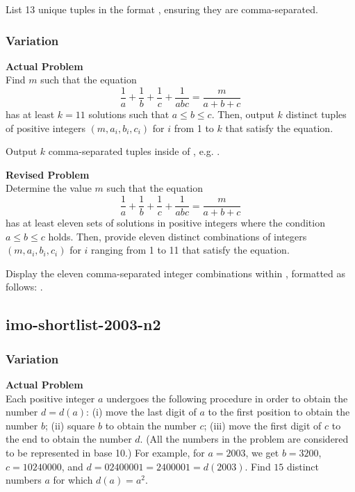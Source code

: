 List 13 unique tuples in the format , ensuring they are comma-separated.

\subsubsection{Variation}
\textbf{Actual Problem}\\
Find $m$ such that the equation
$$
\frac{1}{a} + \frac{1}{b} + \frac{1}{c} + \frac{1}{abc} = \frac{m}{a + b + c}
$$
has at least $k = 11$ solutions such that $a \leq b \leq c$.
Then, output $k$ distinct tuples of positive integers $(m, a_i, b_i, c_i)$ for $i$ from 1 to $k$ that satisfy the equation.


Output $k$ comma-separated tuples inside of \boxed{}, e.g. .

\textbf{Revised Problem}\\
Determine the value \( m \) such that the equation
$$
\frac{1}{a} + \frac{1}{b} + \frac{1}{c} + \frac{1}{abc} = \frac{m}{a + b + c}
$$
has at least eleven sets of solutions in positive integers where the condition \(a \leq b \leq c\) holds. Then, provide eleven distinct combinations of integers \((m, a_i, b_i, c_i)\) for \(i\) ranging from 1 to 11 that satisfy the equation.

Display the eleven comma-separated integer combinations within \boxed{}, formatted as follows: .

\subsection{imo-shortlist-2003-n2}
\subsubsection{Variation}
\textbf{Actual Problem}\\
Each positive integer $a$ undergoes the following procedure in order to obtain the number $d = d(a)$:
(i) move the last digit of $a$ to the first position to obtain the number $b$;
(ii) square $b$ to obtain the number $c$;
(iii) move the first digit of $c$ to the end to obtain the number $d$.
(All the numbers in the problem are considered to be represented in base 10.) 
For example, for $a = 2003$, we get $b = 3200$, $c = 10240000$, and $d = 02400001 = 2400001 = d(2003)$.
Find $15$ distinct numbers $a$ for which $d(a) = a^2$.


